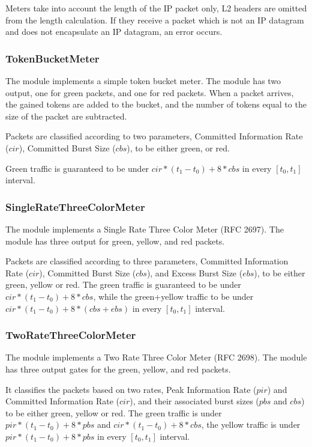 \begin{important}
Meters take into account the length of the IP packet only, L2 headers are omitted
from the length calculation. If they receive a packet which is not
an IP datagram and does not encapsulate an IP datagram, an error occurs.
\end{important}

\subsubsection*{TokenBucketMeter}

The  module implements a simple token bucket meter.
The module has two output, one for green packets, and one for red packets.
When a packet arrives, the gained tokens are added to the bucket, and
the number of tokens equal to the size of the packet are subtracted.

Packets are classified according to two parameters,
Committed Information Rate ($cir$), Committed Burst Size ($cbs$),
to be either green, or red.

Green traffic is guaranteed to be under $cir*(t_1-t_0)+8*cbs$ in
every $[t_0,t_1]$ interval.

\subsubsection*{SingleRateThreeColorMeter}

The  module implements a
Single Rate Three Color Meter (RFC 2697).
The module has three output for green, yellow, and red packets.

Packets are classified according to three parameters,
Committed Information Rate ($cir$), Committed Burst Size ($cbs$),
and Excess Burst Size ($ebs$), to be either green, yellow or red.
The green traffic is guaranteed to be under $cir*(t_1-t_0)+8*cbs$,
while the green+yellow traffic to be under $cir*(t_1-t_0)+8*(cbs+ebs)$
in every $[t_0,t_1]$ interval.


\subsubsection*{TwoRateThreeColorMeter}

The  module implements a
Two Rate Three Color Meter (RFC 2698). The module has three output
gates for the green, yellow, and red packets.

It classifies the packets based on two rates, Peak Information Rate ($pir$)
and Committed Information Rate ($cir$), and their associated burst sizes
($pbs$ and $cbs$) to be either green, yellow or red. The green traffic
is under $pir*(t_1-t_0)+8*pbs$ and $cir*(t_1-t_0)+8*cbs$, the yellow traffic
is under $pir*(t_1-t_0)+8*pbs$ in every $[t_0,t_1]$ interval.

